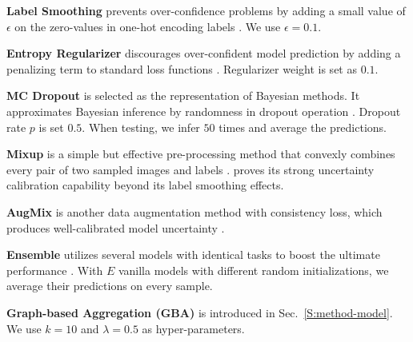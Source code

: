 \documentclass[runningheads]{llncs}
\begin{document}
\textbf{Label Smoothing} prevents over-confidence problems by adding a small value of $\epsilon$ on the zero-values in one-hot encoding labels \cite{szegedy2016rethinking}. We use $\epsilon=0.1$.

\textbf{Entropy Regularizer} discourages over-confident model prediction by adding a penalizing term to standard loss functions \cite{pereyra2017regularizing}. Regularizer weight is set as $0.1$.

\textbf{MC Dropout} is selected as the representation of Bayesian methods. It approximates Bayesian inference by randomness in dropout operation \cite{gal2016dropout}. Dropout rate $p$ is set $0.5$. When testing, we infer $50$ times and average the predictions.

\textbf{Mixup} is a simple but effective pre-processing method that convexly combines every pair of two sampled images and labels \cite{zhang2018mixup}. 
\cite{thulasidasan2019mixup} proves its strong uncertainty calibration capability beyond its label smoothing effects.

\textbf{AugMix} is another data augmentation method with consistency loss, which produces well-calibrated model uncertainty \cite{hendrycks2020augmix}.

\textbf{Ensemble} utilizes several models with identical tasks to boost the ultimate performance \cite{dietterich2000ensemble}. With $E$ vanilla models with different random initializations, we average their predictions on every sample.

\textbf{Graph-based Aggregation (GBA)} is introduced in Sec.~\ref{S:method-model}. We use $k=10$ and $\lambda=0.5$ as hyper-parameters.
	
\end{document}
